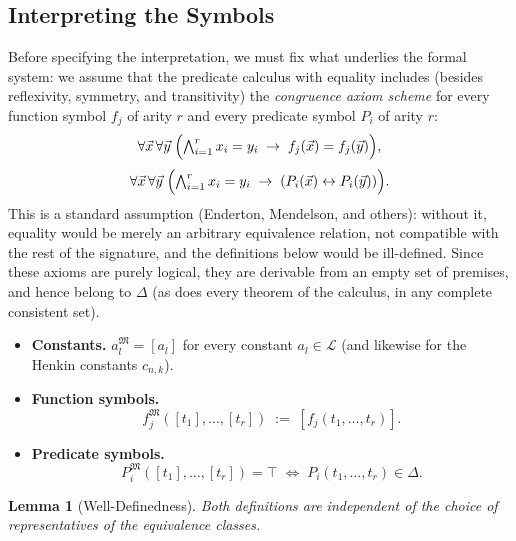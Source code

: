 \documentclass[12pt, a4paper]{article}
\theoremstyle{plain}
\newtheorem{lemma}[theorem]{Lemma}
\theoremstyle{definition}
\newcommand{\Lang}{\mathcal{L}}
\newcommand{\Struct}{\mathfrak{M}}
\begin{document}
\subsection{Interpreting the Symbols}

Before specifying the interpretation, we must fix what
underlies the formal system: we assume that the predicate
calculus with equality includes (besides reflexivity,
symmetry, and transitivity) the \emph{congruence axiom scheme}
for every function symbol $f_j$ of arity $r$ and every
predicate symbol $P_i$ of arity $r$:
\[
  \forall \vec x\, \forall \vec y\;
  \Bigl(\textstyle\bigwedge_{i=1}^{r} x_i = y_i \;\to\; f_j(\vec x) = f_j(\vec y)\Bigr),
\]
\[
  \forall \vec x\, \forall \vec y\;
  \Bigl(\textstyle\bigwedge_{i=1}^{r} x_i = y_i \;\to\; (P_i(\vec x) \leftrightarrow P_i(\vec y))\Bigr).
\]
This is a standard assumption (Enderton, Mendelson, and others): without it,
equality would be merely an arbitrary equivalence relation,
not compatible with the rest of the signature, and the definitions below would be
ill-defined. Since these axioms are purely logical, they are derivable from
an empty set of premises, and hence belong to $\Delta$ (as does
every theorem of the calculus, in any complete consistent set).

\begin{itemize}
  \item \textbf{Constants.} $a_l^{\Struct} = [a_l]$ for every constant
        $a_l \in \Lang$ (and likewise for the Henkin constants $c_{n,k}$).

  \item \textbf{Function symbols.}
        \[
          f_j^{\Struct}([t_1], \ldots, [t_r]) \;:=\; [f_j(t_1, \ldots, t_r)].
        \]

  \item \textbf{Predicate symbols.}
        \[
          P_i^{\Struct}([t_1], \ldots, [t_r]) = \top
          \;\iff\; P_i(t_1,\ldots,t_r) \in \Delta.
        \]
\end{itemize}

\begin{lemma}[Well-Definedness]\label{lem:welldefined}
Both definitions are independent of the choice of representatives
of the equivalence classes.
\end{lemma}
\end{document}
